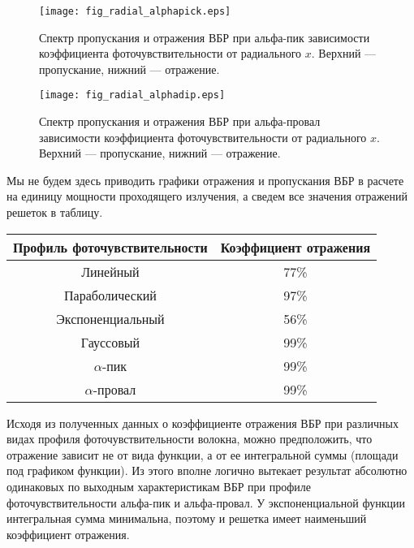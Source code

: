 \begin{figure}
  \centering
  \texttt{[image: fig\_radial\_alphapick.eps]}\\
  \caption{Спектр пропускания и отражения ВБР при альфа-пик зависимости коэффициента фоточувствительности от радиального $x$. Верхний --- пропускание, нижний --- отражение.}\label{fig_radial_alphapick}
\end{figure}

\begin{figure}
  \centering
  \texttt{[image: fig\_radial\_alphadip.eps]}\\
  \caption{Спектр пропускания и отражения ВБР при альфа-провал зависимости коэффициента фоточувствительности от радиального $x$. Верхний --- пропускание, нижний --- отражение.}\label{fig_radial_alphadip}
\end{figure}

Мы не будем здесь приводить графики отражения и пропускания ВБР в расчете на единицу мощности проходящего излучения, а сведем все значения отражений решеток в таблицу.

\begin{tabular}{|c|c|}
\hline \rule[-2ex]{0pt}{5.5ex} \textbf{Профиль фоточувствительности} & \textbf{Коэффициент отражения} \\ \hline
\hline \rule[-2ex]{0pt}{5.5ex} Линейный & 77\% \\
\hline \rule[-2ex]{0pt}{5.5ex} Параболический & 97\% \\
\hline \rule[-2ex]{0pt}{5.5ex} Экспоненциальный & 56\% \\
\hline \rule[-2ex]{0pt}{5.5ex} Гауссовый & 99\% \\
\hline \rule[-2ex]{0pt}{5.5ex} $\alpha$-пик & 99\% \\
\hline \rule[-2ex]{0pt}{5.5ex} $\alpha$-провал & 99\% \\
\hline
\end{tabular}

\bigskip
Исходя из полученных данных о коэффициенте отражения ВБР при различных видах профиля фоточувствительности волокна, можно предположить, что отражение зависит не от вида функции, а от ее интегральной суммы (площади под графиком функции). Из этого вполне логично вытекает результат абсолютно одинаковых по выходным характеристикам ВБР при профиле фоточувствительности альфа-пик и альфа-провал. У экспоненциальной функции интегральная сумма минимальна, поэтому и решетка имеет наименьший коэффициент отражения.


